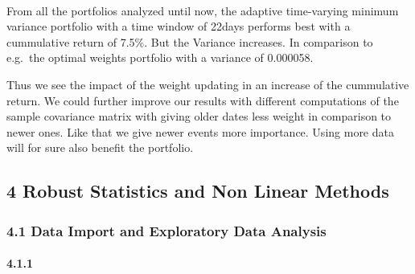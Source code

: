 \documentclass[11pt]{article}
\begin{document}
    \begin{center}
    \end{center}
    { \hspace*{\fill} \\}
    
    From all the portfolios analyzed until now, the adaptive time-varying
minimum variance portfolio with a time window of 22days performs best
with a cummulative return of 7.5\%. But the Variance increases. In
comparison to e.g.~the optimal weights portfolio with a variance of
0.000058.

Thus we see the impact of the weight updating in an increase of the
cummulative return. We could further improve our results with different
computations of the sample covariance matrix with giving older dates
less weight in comparison to newer ones. Like that we give newer events
more importance. Using more data will for sure also benefit the
portfolio.

    \hypertarget{robust-statistics-and-non-linear-methods}{%
\subsection{4 Robust Statistics and Non Linear
Methods}\label{robust-statistics-and-non-linear-methods}}

    \hypertarget{data-import-and-exploratory-data-analysis}{%
\subsubsection{4.1 Data Import and Exploratory Data
Analysis}\label{data-import-and-exploratory-data-analysis}}

    \hypertarget{section}{%
\paragraph{4.1.1}\label{section}}
\end{document}
